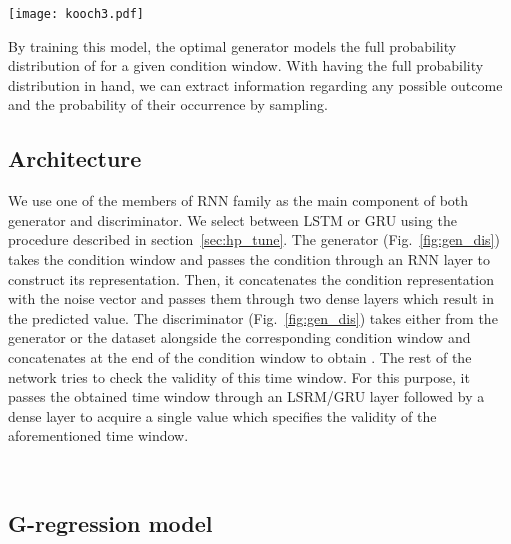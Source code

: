 \documentclass{ieeeaccess}
\begin{document}
\begin{figure*}
	\centering
	\texttt{[image: kooch3.pdf]}
	\caption{Overview of proposed ForGAN architecture. The condition  is handed to generator  and discriminator .  }
	\label{fig:gan}
\end{figure*}

By training this model, the optimal generator models the full probability distribution of  for a given condition window. With having the full probability distribution in hand, we can extract information regarding any possible outcome and the probability of their occurrence by sampling.

\subsection{Architecture}

We use one of the members of RNN family as the main component of both generator and discriminator. We select between LSTM or GRU using the procedure described in section~\ref{sec:hp_tune}. The generator (Fig.~\ref{fig:gen_dis}) takes the condition window and passes the condition through an RNN layer to construct its representation. Then, it concatenates the condition representation with the noise vector and passes them through two dense layers which result in the predicted  value. The discriminator (Fig.~\ref{fig:gen_dis}) takes  either from the generator or the dataset alongside the corresponding condition  window and concatenates  at the end of the condition window to obtain . The rest of the network tries to check the validity of this time window. For this purpose, it passes the obtained time window through an LSRM/GRU layer followed by a dense layer to acquire a single value which specifies the validity of the  aforementioned time window.

\begin{figure*}[t]
	\centering
	\\
	\caption{(a): The architecture of the generator in detail. The generator takes noise vector and a time windows and forecasts the value of next step () . (b): The architecture of the discriminator in detail. The discriminator receives  and time window and determines if  is valid.}
	\label{fig:gen_dis} 
\end{figure*}


\subsection{G-regression model}
\end{document}
